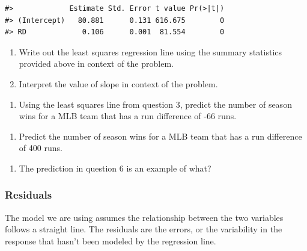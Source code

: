 \documentclass[
]{report}
\providecommand{\tightlist}{%
  \setlength{\itemsep}{0pt}\setlength{\parskip}{0pt}}
\begin{document}
\begin{verbatim}
#>             Estimate Std. Error t value Pr(>|t|)
#> (Intercept)   80.881      0.131 616.675        0
#> RD             0.106      0.001  81.554        0
\end{verbatim}

\begin{enumerate}
\def\labelenumi{\arabic{enumi}.}
\setcounter{enumi}{2}
\item
  Write out the least squares regression line using the summary statistics provided above in context of the problem.
  \vspace{0.8in}
\item
  Interpret the value of slope in context of the problem.
\end{enumerate}

\vspace{.8in}

\begin{enumerate}
\def\labelenumi{\arabic{enumi}.}
\setcounter{enumi}{4}
\tightlist
\item
  Using the least squares line from question 3, predict the number of season wins for a MLB team that has a run difference of -66 runs.
\end{enumerate}

\vspace{.6in}

\begin{enumerate}
\def\labelenumi{\arabic{enumi}.}
\setcounter{enumi}{5}
\tightlist
\item
  Predict the number of season wins for a MLB team that has a run difference of 400 runs.
\end{enumerate}

\vspace{0.8in}

\begin{enumerate}
\def\labelenumi{\arabic{enumi}.}
\setcounter{enumi}{6}
\tightlist
\item
  The prediction in question 6 is an example of what?
\end{enumerate}

\vspace{0.3in}

\subsubsection*{Residuals}\label{residuals}

The model we are using assumes the relationship between the two variables follows a straight line. The residuals are the errors, or the variability in the response that hasn't been modeled by the regression line.
\end{document}
